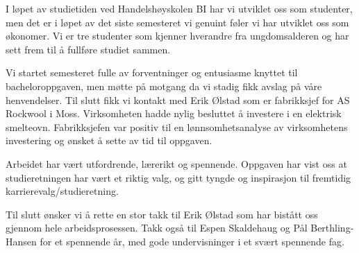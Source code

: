 I løpet av studietiden ved Handelshøyskolen BI har vi utviklet oss som studenter, men det er i løpet av det siste semesteret vi genuint føler vi har utviklet oss som økonomer. Vi er tre studenter som kjenner hverandre fra ungdomsalderen og har sett frem til å fullføre studiet sammen. 

\indent \newline
Vi startet semesteret fulle av forventninger og entusiasme knyttet til bacheloroppgaven, men møtte på motgang da vi stadig fikk avslag på våre henvendelser. Til slutt fikk vi kontakt med Erik Ølstad som er fabrikksjef for AS Rockwool i Moss. Virksomheten hadde nylig besluttet å investere i en elektrisk smelteovn. Fabrikksjefen var positiv til en lønnsomhetsanalyse av virksomhetens investering og ønsket å sette av tid til oppgaven. 

\indent \newline
Arbeidet har vært utfordrende, lærerikt og spennende. Oppgaven har vist oss at studieretningen har vært et riktig valg, og gitt tyngde og inspirasjon til fremtidig karrierevalg/studieretning.

\indent \newline
Til slutt ønsker vi å rette en stor takk til Erik Ølstad som har bistått oss gjennom hele arbeidsprosessen. Takk også til Espen Skaldehaug og Pål Berthling-Hansen for et spennende år, med gode undervisninger i et svært spennende fag.
